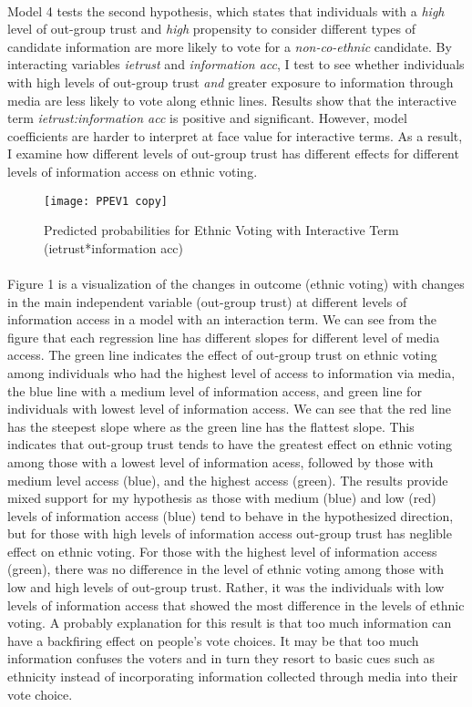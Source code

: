 \documentclass[a4paper, 12pt]{article}
\begin{document}
\paragraph{}
Model 4 tests the second hypothesis, which states that individuals with a \textit{high} level of out-group trust and \textit{high} propensity to consider different types of candidate information are more likely to vote for a \textit{non-co-ethnic} candidate. By interacting variables \textit{ietrust} and \textit{information acc}, I test to see whether individuals with high levels of out-group trust \textit{and} greater exposure to information through media are less likely to vote along ethnic lines. Results show that the interactive term \textit{ietrust:information acc} is positive and significant. However, model coefficients are harder to interpret at face value for interactive terms. As a result, I examine how different levels of out-group trust has different effects for different levels of information access on ethnic voting.
\begin{figure}[H]
	\centering
	\texttt{[image: PPEV1 copy]}
	\caption{Predicted probabilities for Ethnic Voting with Interactive Term (ietrust*information acc) }
\end{figure}
\paragraph{}
Figure 1 is a visualization of the changes in outcome (ethnic voting) with changes in the main independent variable (out-group trust) at different levels of information access in a model with an interaction term. We can see from the figure that each regression line has different slopes for different level of media access. The green line indicates the effect of out-group trust on ethnic voting among individuals who had the highest level of access to information via media, the blue line with a medium level of information access, and green line for individuals with lowest level of information access. We can see that the red line has the steepest slope where as the green line has the flattest slope. This indicates that out-group trust tends to have the greatest effect on ethnic voting among those with a lowest level of information acess, followed by those with medium level access (blue), and the highest access (green). The results provide mixed support for my hypothesis as those with medium (blue) and low (red) levels of information access (blue) tend to behave in the hypothesized direction, but for those with high levels of information access out-group trust has neglible effect on ethnic voting. For those with the highest level of information access (green), there was no difference in the level of ethnic voting among those with low and high levels of out-group trust. Rather, it was the individuals with low levels of information access that showed the most difference in the levels of ethnic voting. A probably explanation for this result is that too much information can have a backfiring effect on people's vote choices. It may be that too much information confuses the voters and in turn they resort to basic cues such as ethnicity instead of incorporating information collected through media into their vote choice. 
\end{document}
